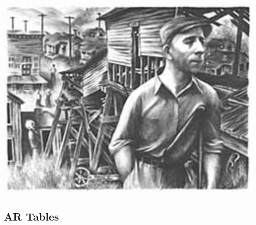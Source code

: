 \documentclass[12pt,twoside]{article}
\begin{document}
\includegraphics[width=14cm]{Pictures/shahn.jpg}

\normalsize
\newpage

\subsection{AR Tables}
\label{sec:orgheadline99}
\end{document}
